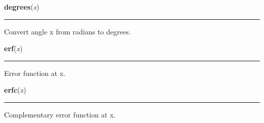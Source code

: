     \vspace{0.5ex}

\hspace{.8\funcindent}\begin{boxedminipage}{\funcwidth}

    \raggedright \textbf{degrees}(\textit{x})

    \vspace{-1.5ex}

    \rule{\textwidth}{0.5\fboxrule}
\setlength{\parskip}{2ex}
    Convert angle x from radians to degrees.

\setlength{\parskip}{1ex}
    \end{boxedminipage}

    \label{math:erf}

    \vspace{0.5ex}

\hspace{.8\funcindent}\begin{boxedminipage}{\funcwidth}

    \raggedright \textbf{erf}(\textit{x})

    \vspace{-1.5ex}

    \rule{\textwidth}{0.5\fboxrule}
\setlength{\parskip}{2ex}
    Error function at x.

\setlength{\parskip}{1ex}
    \end{boxedminipage}

    \label{math:erfc}

    \vspace{0.5ex}

\hspace{.8\funcindent}\begin{boxedminipage}{\funcwidth}

    \raggedright \textbf{erfc}(\textit{x})

    \vspace{-1.5ex}

    \rule{\textwidth}{0.5\fboxrule}
\setlength{\parskip}{2ex}
    Complementary error function at x.

\setlength{\parskip}{1ex}
    \end{boxedminipage}

    \label{math:exp}

    \vspace{0.5ex}

